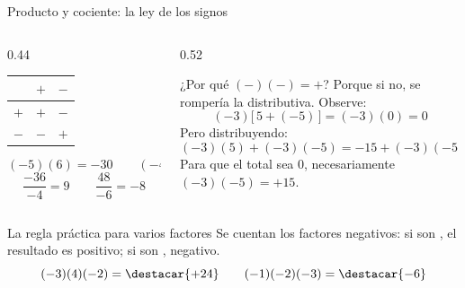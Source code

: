 \documentclass[aspectratio=169,10pt]{beamer}
\begin{document}
\begin{frame}{Producto y cociente: la ley de los signos}
  \scriptsize
  \begin{columns}[T,onlytextwidth]
    \begin{column}{0.44\textwidth}
      \centering
      \begin{tabular}{@{}ccc@{}}
        \toprule
        & $+$ & $-$ \\
        \midrule
        $+$ & $+$ & $-$ \\
        $-$ & $-$ & $+$ \\
        \bottomrule
      \end{tabular}

      \vspace{0.15cm}
      \[ (-5)(6) = -30 \qquad (-4)(-9) = 36 \]
      \[ \frac{-36}{-4} = 9 \qquad \frac{48}{-6} = -8 \]
    \end{column}
    \begin{column}{0.52\textwidth}
      \begin{exampleblock}{¿Por qué $(-)(-) = +$?}
        \tiny
        Porque si no, se rompería la distributiva. Observe:
        \[ (-3)\big[\,5 + (-5)\,\big] = (-3)(0) = 0 \]
        Pero distribuyendo:
        \[ (-3)(5) + (-3)(-5) = -15 + (-3)(-5) \]
        Para que el total sea $0$, necesariamente $(-3)(-5) = +15$.
      \end{exampleblock}
    \end{column}
  \end{columns}

  \vspace{0.1cm}
  \begin{alertblock}{La regla práctica para varios factores}
    \scriptsize
    Se cuentan los factores negativos: si son , el resultado es
    positivo; si son , negativo.
    \[ (-3)(4)(-2) = \destacar{+24} \qquad (-1)(-2)(-3) = \destacar{-6} \]
  \end{alertblock}
\end{frame}
\end{document}
